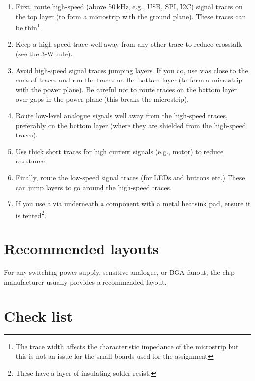 \begin{enumerate}

\item First, route high-speed (above 50\,kHz, e.g., USB, SPI, I2C)
  signal traces on the top layer (to form a microstrip with the ground
  plane).  These traces can be thin\footnote{The trace width affects
    the characteristic impedance of the microstrip but this is not an
    issue for the small boards used for the assignment}.

\item Keep a high-speed trace well away from any other trace to reduce
  crosstalk (see the 3-W rule).

\item Avoid high-speed signal traces jumping layers.  If you do, use
  vias close to the ends of traces and run the traces on the bottom
  layer (to form a microstrip with the power plane).  Be careful not
  to route traces on the bottom layer over gaps in the power plane
  (this breaks the microstrip).

\item Route low-level analogue signals well away from the high-speed
  traces, preferably on the bottom layer (where they are shielded from
  the high-speed traces).

\item Use thick short traces for high current signals (e.g., motor) to
  reduce resistance.

\item Finally, route the low-speed signal traces (for LEDs and buttons
  etc.)  These can jump layers to go around the high-speed traces.

\item If you use a via underneath a component with a metal heatsink
  pad, ensure it is tented\footnote{These have a layer of insulating
    solder resist.}.
\end{enumerate}


\section{Recommended layouts}

For any switching power supply, sensitive analogue, or BGA fanout, the
chip manufacturer usually provides a recommended layout.

\section{Check list}
\label{PCB-check-list}

